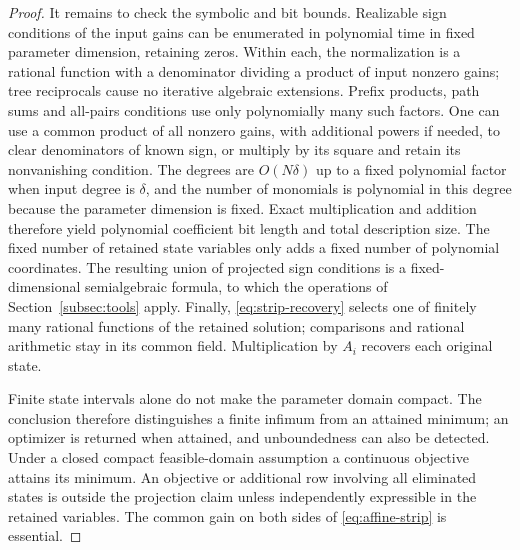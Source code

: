 \begin{proof}
It remains to check the symbolic and bit bounds. Realizable sign conditions
of the input gains can be enumerated in polynomial time in fixed parameter
dimension, retaining zeros. Within each, the normalization is a rational
function with a denominator dividing a product of input nonzero gains; tree
reciprocals cause no iterative algebraic extensions. Prefix products, path
sums and all-pairs conditions use only polynomially many such factors.
One can use a common product of all nonzero gains, with additional powers if
needed, to clear denominators of known sign, or multiply by its square and
retain its nonvanishing condition. The degrees are \(O(N\delta)\) up to a
fixed polynomial factor when input degree is \(\delta\), and the number of
monomials is polynomial in this degree because the parameter dimension is
fixed. Exact multiplication and addition therefore yield polynomial coefficient
bit length and total description size. The fixed number of retained state
variables only adds a fixed number of polynomial coordinates. The resulting
union of projected sign conditions is a fixed-dimensional semialgebraic
formula, to which the operations of Section~\ref{subsec:tools} apply.
Finally, \eqref{eq:strip-recovery} selects one of finitely many rational functions
of the retained solution; comparisons and rational arithmetic stay in its
common field. Multiplication by \(A_i\) recovers each original state.

Finite state intervals alone do not make the parameter domain compact. The
conclusion therefore distinguishes a finite infimum from an attained minimum;
an optimizer is returned when attained, and unboundedness can also be detected.
Under a closed compact feasible-domain assumption a continuous objective
attains its minimum. An objective or additional row involving all eliminated
states is outside the projection claim unless independently expressible in the
retained variables. The common gain on both sides of
\eqref{eq:affine-strip} is essential.
\end{proof}
